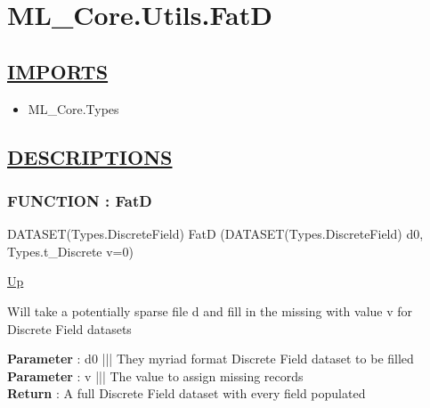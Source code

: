 \chapter*{ML\_Core.Utils.FatD}
\hypertarget{ecldoc:toc:ML_Core.Utils.FatD}{}

\section*{\underline{IMPORTS}}
\begin{itemize}
\item ML\_Core.Types
\end{itemize}

\section*{\underline{DESCRIPTIONS}}
\subsection*{FUNCTION : FatD}
\hypertarget{ecldoc:ml_core.utils.fatd}{}
\begin{minipage}[t]{\textwidth}
\begin{flushleft}
DATASET(Types.DiscreteField) FatD (DATASET(Types.DiscreteField) d0, Types.t\_Discrete v=0)
\end{flushleft}
\end{minipage}
\hyperlink{ecldoc:toc:ML_Core/Utils}{Up}

\par
Will take a potentially sparse file d and fill in the missing with value v for Discrete Field datasets
\par
\textbf{Parameter} : d0 ||| They myriad format Discrete Field dataset to be filled \\
\textbf{Parameter} : v ||| The value to assign missing records \\
\textbf{Return} : A full Discrete Field dataset with every field populated \\
